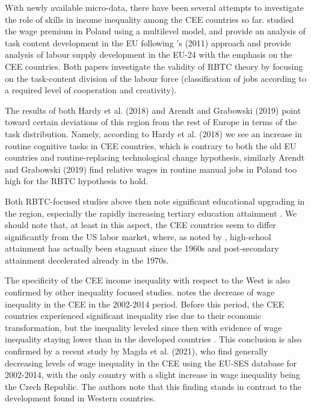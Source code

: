 \documentclass[11pt]{article}
\begin{document}
With newly available micro-data, there have been several attempts to investigate the role of skills in income inequality among the CEE countries so far. \citet{arendt2019technical} studied the wage premium in Poland using a multilevel model, and \citet{hardy2018educational} provide an analysis of task content development in the EU following \citeauthor{acemoglu2011skills}'s (2011) approach and provide analysis of labour supply development in the EU-24 with the emphasis on the CEE countries. Both papers investigate the validity of RBTC theory by focusing on the task-content division of the labour force (classification of jobs according to a required level of cooperation and creativity).

The results of both Hardy et al. (2018) and Arendt and Grabowski (2019) point toward certain deviations of this region from the rest of Europe in terms of the task distribution. Namely, according to Hardy et al. (2018) we see an increase in routine cognitive tasks in CEE countries, which is contrary to both the old EU countries and routine-replacing technological change hypothesis, similarly Arendt and Grabowski (2019) find relative wages in routine manual jobs in Poland too high for the RBTC hypothesis to hold. 

Both RBTC-focused studies above then note significant educational upgrading in the region, especially the rapidly increasing tertiary education attainment \citep{hardy2018educational}. We should note that, at least in this aspect, the CEE countries seem to differ significantly from the US labor market, where, as noted by \citet{acemoglu2012does}, high-school attainment has actually been stagnant since the 1960s and post-secondary attainment decelerated already in the 1970s.

The specificity of the CEE income inequality with respect to the West is also confirmed by  other inequality focused studies. \citet{magda2021firms} notes the decrease of wage inequality in the CEE in the 2002-2014 period. Before this period, the CEE countries experienced significant inequality rise due to their economic transformation, but the inequality leveled since then \citep{tyrowicz2019wage} with evidence of wage inequality staying lower than in the developed countries \citep{mysikova2018personal}. This conclusion is also confirmed by a recent study by Magda et al. (2021), who find generally decreasing levels of wage inequality in the CEE using the EU-SES database for 2002-2014, with the only country with a slight increase in wage inequality being the Czech Republic. The authors note that this finding stands in contrast to the development found in Western countries.%
\end{document}
